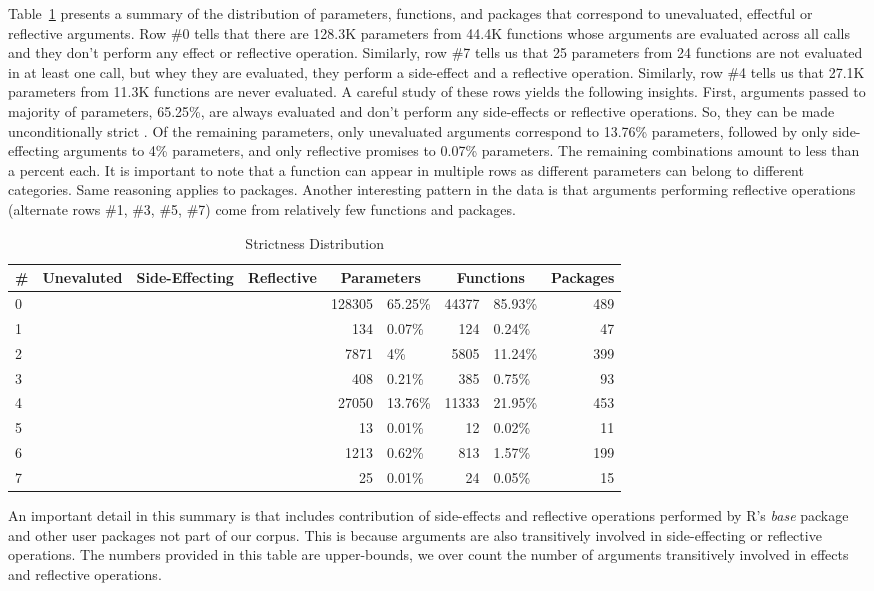 \documentclass[review,nonacm,screen,acmsmall,anonymous=true]{acmart}
\newcommand{\xmark}{\textcolor{red}{\ding{55}}}
\newcommand{\cmark}{\textcolor{green}{\ding{51}}}
\begin{document}
Table~\ref{table:strictdist} presents a summary of the distribution of
parameters, functions, and packages that correspond to unevaluated, effectful or
reflective arguments. Row \#0 tells that there are 128.3K parameters from 44.4K
functions whose arguments are evaluated across all calls and they don't perform
any effect or reflective operation. Similarly, row \#7 tells us that 25
parameters from 24 functions are not evaluated in at least one call, but whey
they are evaluated, they perform a side-effect and a reflective operation.
Similarly, row \#4 tells us that 27.1K parameters from 11.3K functions are never
evaluated. A careful study of these rows yields the following insights. First,
arguments passed to majority of parameters, 65.25\%, are always evaluated and
don't perform any side-effects or reflective operations. So, they can be made
unconditionally strict . Of the remaining parameters, only unevaluated arguments
correspond to 13.76\% parameters, followed by only side-effecting arguments to
4\% parameters, and only reflective promises to 0.07\% parameters. The remaining
combinations amount to less than a percent each. It is important to note that a
function can appear in multiple rows as different parameters can belong to
different categories. Same reasoning applies to packages. Another interesting
pattern in the data is that arguments performing reflective operations
(alternate rows \#1, \#3, \#5, \#7) come from relatively few functions and
packages.
%
\begin{table}
  \vspace{-3mm}
  \small
  \caption{Strictness Distribution} \label{table:strictdist}
  \centering
  \begin{tabular}{lcccr|lr|lr}
    \toprule
    \#&\bf Unevaluted & \bf Side-Effecting & \bf Reflective & \multicolumn{2}{c}{\textbf{Parameters}} & \multicolumn{2}{c}{\textbf{Functions}}& \bf Packages\\
    \midrule
    0&\xmark{}&\xmark{}&\xmark{}&128305&65.25\%&44377&85.93\%&489\\
    1&\xmark{}&\xmark{}&\cmark{}&134&0.07\%&124&0.24\%&47\\
    2&\xmark{}&\cmark{}&\xmark{}&7871&4\%&5805&11.24\%&399\\
    3&\xmark{}&\cmark{}&\cmark{}&408&0.21\%&385&0.75\%&93\\
    4&\cmark{}&\xmark{}&\xmark{}&27050&13.76\%&11333&21.95\%&453\\
    5&\cmark{}&\xmark{}&\cmark{}&13&0.01\%&12&0.02\%&11\\
    6&\cmark{}&\cmark{}&\xmark{}&1213&0.62\%&813&1.57\%&199\\
    7&\cmark{}&\cmark{}&\cmark{}&25&0.01\%&24&0.05\%&15\\
    \bottomrule
  \end{tabular}
\end{table}
%
An important detail in this summary is that includes contribution of
side-effects and reflective operations performed by R's \emph{base} package and
other user packages not part of our corpus. This is because arguments are also
transitively involved in side-effecting or reflective operations. The numbers
provided in this table are upper-bounds, we over count the number of arguments
transitively involved in effects and reflective operations.
\end{document}
